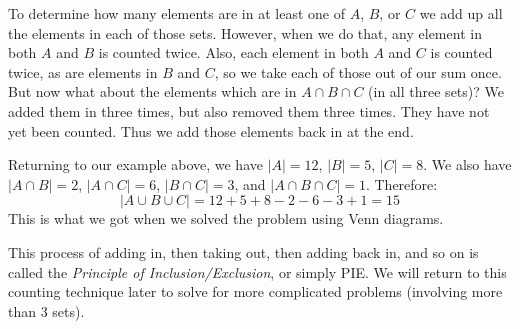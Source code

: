 \documentclass[12pt]{article}
\begin{document}
To determine how many elements are in at least one of $A$, $B$, or $C$ we add up all the elements in each of those sets.  However, when we do that, any element in both $A$ and $B$ is counted twice.  Also, each element in both $A$ and $C$ is counted twice, as are elements in $B$ and $C$, so we take each of those out of our sum once.  But now what about the elements which are in $A \cap B \cap C$ (in all three sets)?  We added them in three times, but also removed them three times.  They have not yet been counted.  Thus we add those elements back in at the end.

Returning to our example above, we have $|A| = 12$, $|B| = 5$, $|C| = 8$.  We also have $|A \cap B| = 2$, $|A \cap C| = 6$, $|B \cap C| = 3$, and $|A \cap B \cap C| = 1$.  Therefore:
\[|A \cup B \cup C| = 12 + 5 + 8 - 2 - 6 - 3 + 1 = 15\]
This is what we got when we solved the problem using Venn diagrams.

This process of adding in, then taking out, then adding back in, and so on is called the {\em Principle of Inclusion/Exclusion}, or simply PIE.  We will return to this counting technique later to solve for more complicated problems (involving more than 3 sets).
\end{document}
